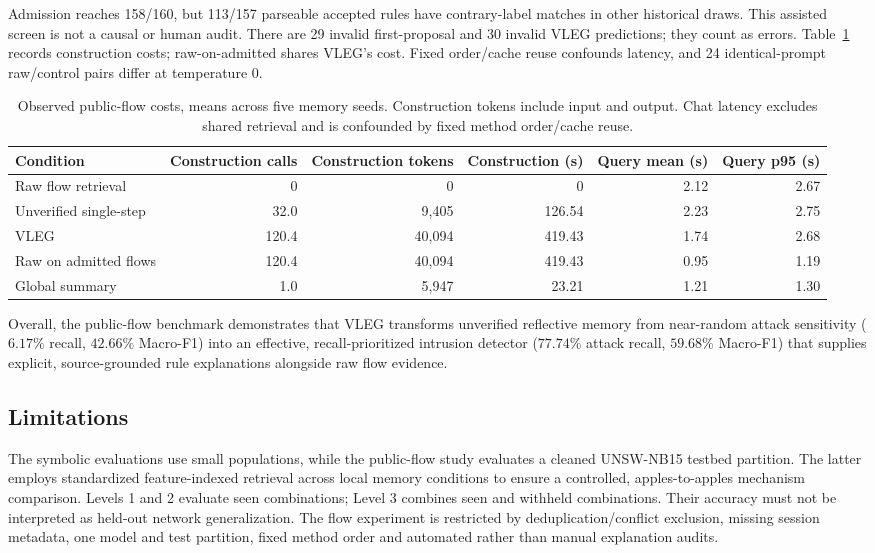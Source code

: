 \documentclass[journal]{IEEEtran}
\theoremstyle{definition}
\theoremstyle{remark}
\begin{document}
Admission reaches 158/160, but 113/157 parseable accepted rules have contrary-label matches in other historical draws. This assisted screen is not a causal or human audit. There are 29 invalid first-proposal and 30 invalid VLEG predictions; they count as errors. Table~\ref{tab:exp6_cost} records construction costs; raw-on-admitted shares VLEG's cost. Fixed order/cache reuse confounds latency, and 24 identical-prompt raw/control pairs differ at temperature $0$.

\begin{table}[!t]
\centering
\caption{Observed public-flow costs, means across five memory seeds. Construction tokens include input and output. Chat latency excludes shared retrieval and is confounded by fixed method order/cache reuse.}
\label{tab:exp6_cost}
\small
\begin{tabular}{lrrrrr}
\toprule
\textbf{Condition} & \textbf{Construction calls} & \textbf{Construction tokens} & \textbf{Construction (s)} & \textbf{Query mean (s)} & \textbf{Query p95 (s)} \\
\midrule
Raw flow retrieval & 0 & 0 & 0 & 2.12 & 2.67 \\
Unverified single-step & 32.0 & 9,405 & 126.54 & 2.23 & 2.75 \\
VLEG & 120.4 & 40,094 & 419.43 & 1.74 & 2.68 \\
Raw on admitted flows & 120.4 & 40,094 & 419.43 & 0.95 & 1.19 \\
Global summary & 1.0 & 5,947 & 23.21 & 1.21 & 1.30 \\
\bottomrule
\end{tabular}
\end{table}

Overall, the public-flow benchmark demonstrates that VLEG transforms unverified reflective memory from near-random attack sensitivity ($6.17\%$ recall, $42.66\%$ Macro-F1) into an effective, recall-prioritized intrusion detector ($77.74\%$ attack recall, $59.68\%$ Macro-F1) that supplies explicit, source-grounded rule explanations alongside raw flow evidence.

\subsection{Limitations}
\label{sec:limitations}
The symbolic evaluations use small populations, while the public-flow study evaluates a cleaned UNSW-NB15 testbed partition. The latter employs standardized feature-indexed retrieval across local memory conditions to ensure a controlled, apples-to-apples mechanism comparison. Levels 1 and 2 evaluate seen combinations; Level 3 combines seen and withheld combinations. Their accuracy must not be interpreted as held-out network generalization. The flow experiment is restricted by deduplication/conflict exclusion, missing session metadata, one model and test partition, fixed method order and automated rather than manual explanation audits.
\end{document}
